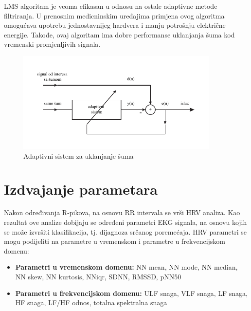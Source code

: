 \documentclass[12pt]{SeminarskiADS}
\begin{document}
LMS algoritam je veoma efikasan u odnosu na ostale adaptivne metode filtriranja. U prenosnim medicninskim uređajima primjena ovog algoritma omogućava upotrebu jednostavnijeg hardvera i manju potrošnju električne energije. Takođe, ovaj algoritam ima dobre performanse uklanjanja šuma kod vremenski promjenljivih signala.

\begin{figure}[tbp]
\centering
\includegraphics[width=0.9\textwidth]{lms_denoise}
\caption{Adaptivni sistem za uklanjanje šuma}
\label{lms_denoise}
\end{figure}

\section{Izdvajanje parametara}
\label{sec:extraction}
Nakon određivanja R-pikova, na osnovu RR intervala se vrši HRV analiza. Kao rezultat ove analize dobijaju se određeni parametri EKG signala, na osnovu kojih se može izvršiti klasifikacija, tj. dijagnoza srčanog poremećaja. HRV parametri se mogu podijeliti na parametre u vremenskom i parametre u frekvencijskom domenu:

\begin{itemize}
\item \textbf{Parametri u vremenskom domenu: } NN mean, NN mode, NN median, NN skew, NN kurtosis, NNiqr, SDNN, RMSSD, pNN50
\item \textbf{Parametri u frekvencijskom domenu: } ULF snaga, VLF snaga, LF snaga, HF snaga, LF/HF odnos, totalna spektralna snaga
\end{itemize}



\end{document}

